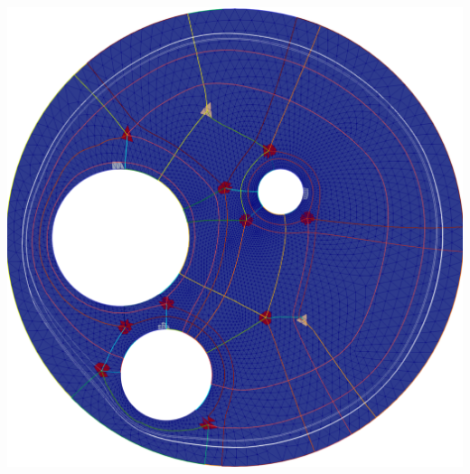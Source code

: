 \documentclass[a0paper,portrait, fontscale=0.30]{baposter}
\begin{document}
\begin{poster}
{\begin{center}
\begin{minipage}[!HT]{0.79\linewidth}
\includegraphics[width=1.0\textwidth]{Circle_with_circle_holes_refSS1-cycle}
\label{fig:figure10}
\vspace{-0.2cm}
\end{minipage}
\end{center}
}
\end{poster}
\end{document}
